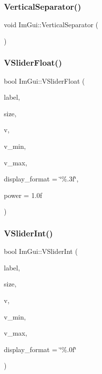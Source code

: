 \mbox{\label{namespace_im_gui_ae60f7b8ece8808c477796e6594c8d796}} 
\subsubsection{\texorpdfstring{Vertical\+Separator()}{VerticalSeparator()}}
{\footnotesize\ttfamily void Im\+Gui\+::\+Vertical\+Separator (\begin{DoxyParamCaption}{ }\end{DoxyParamCaption})}

\mbox{\label{namespace_im_gui_ae629791ee70ba60199597cd1866b3735}} 
\subsubsection{\texorpdfstring{V\+Slider\+Float()}{VSliderFloat()}}
{\footnotesize\ttfamily bool Im\+Gui\+::\+V\+Slider\+Float (\begin{DoxyParamCaption}\item[{const char $\ast$}]{label,  }\item[{const \mbox{\hyperlink{struct_im_vec2}{Im\+Vec2}} \&}]{size,  }\item[{float $\ast$}]{v,  }\item[{float}]{v\+\_\+min,  }\item[{float}]{v\+\_\+max,  }\item[{const char $\ast$}]{display\+\_\+format = {\ttfamily \char`\"{}\%.3f\char`\"{}},  }\item[{float}]{power = {\ttfamily 1.0f} }\end{DoxyParamCaption})}

\mbox{\label{namespace_im_gui_a7a8e53471ef7f8b7ad28abea35a40bf4}} 
\subsubsection{\texorpdfstring{V\+Slider\+Int()}{VSliderInt()}}
{\footnotesize\ttfamily bool Im\+Gui\+::\+V\+Slider\+Int (\begin{DoxyParamCaption}\item[{const char $\ast$}]{label,  }\item[{const \mbox{\hyperlink{struct_im_vec2}{Im\+Vec2}} \&}]{size,  }\item[{int $\ast$}]{v,  }\item[{int}]{v\+\_\+min,  }\item[{int}]{v\+\_\+max,  }\item[{const char $\ast$}]{display\+\_\+format = {\ttfamily \char`\"{}\%.0f\char`\"{}} }\end{DoxyParamCaption})}

